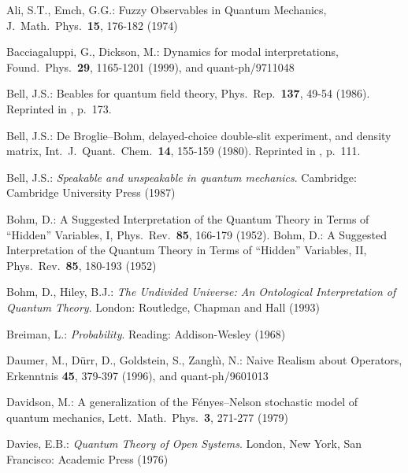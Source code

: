 \documentclass[12pt]{article}
\newcommand{\1}{\mathbf{1}} %
\begin{document}
\begin{thebibliography}{28.}

 Ali, S.T., Emch, G.G.: Fuzzy Observables in Quantum
   Mechanics, J.\ Math.\ Phys.\ \textbf{15}, 176-182 (1974)


 Bacciagaluppi, G., Dickson, M.: Dynamics for modal
   interpretations, Found.\ Phys.\ \textbf{29},
   1165-1201 (1999), and quant-ph/9711048

 Bell, J.S.: Beables for quantum field
   theory, Phys.\ Rep.\ \textbf{137}, 49-54 (1986). Reprinted in
   \cite{Bellbook}, p.~173.

 Bell, J.S.: De Broglie--Bohm, delayed-choice
   double-slit experiment, and density matrix, Int.\ J.\ Quant.\
   Chem.\ \textbf{14}, 155-159 (1980). Reprinted in \cite{Bellbook},
   p.~111.

 Bell, J.S.: \textit{Speakable and unspeakable in
   quantum mechanics}.  Cambridge: Cambridge University Press (1987)


 Bohm, D.: A Suggested Interpretation of the Quantum
   Theory in Terms of ``Hidden'' Variables, I, Phys.\ Rev.\
   \textbf{85}, 166-179 (1952).  Bohm, D.: A Suggested Interpretation
   of the Quantum Theory in Terms of ``Hidden'' Variables, II, Phys.\
   Rev.\ \textbf{85}, 180-193 (1952)

\bibitem{BH} Bohm, D., Hiley, B.J.: \textit{The Undivided Universe: An
   Ontological Interpretation of Quantum Theory}. London: Routledge,
   Chapman and Hall (1993)

\bibitem{Breiman} Breiman, L.: \textit{Probability}. Reading:
   Addison-Wesley (1968)

\bibitem{naive} Daumer, M., D\"urr, D., Goldstein, S., Zangh{\`\i},
   N.: Naive Realism about Operators, Erkenntnis \textbf{45},
   379-397 (1996), and quant-ph/9601013

\bibitem{Davidson} Davidson, M.: A generalization of the
   F\'enyes--Nelson stochastic model of quantum mechanics, Lett.\
   Math.\ Phys.\ \textbf{3}, 271-277 (1979)

\bibitem{Davies} Davies, E.B.: \textit{Quantum Theory of Open Systems}.
   London, New York, San Francisco: Academic Press (1976)


\end{thebibliography}
\end{document}
